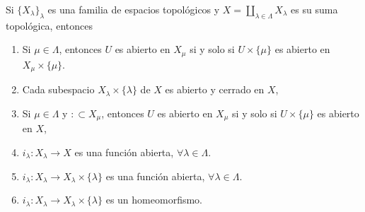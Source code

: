 

\begin{theorem}
Si $\{ X_{\lambda} \}_{\lambda}$ es una familia de espacios topológicos y $X = \coprod_{\lambda \in \Lambda} X_{\lambda}$ es su suma topológica, entonces
\begin{enumerate}[label=\textnormal{(\roman*)}, align=left, labelwidth=1.7em, leftmargin=3.0em]
\item Si $\mu \in \Lambda$, entonces $U$ es abierto en $X_{\mu}$ si y solo si $U \times \{ \mu \}$ es abierto en $X_{\mu} \times \{ \mu \}$.
\item Cada subespacio $X_{\lambda} \times \{ \lambda \}$ de $X$ es abierto y cerrado en $X$,
\item Si $\mu \in \Lambda$ y $: \subset X_{\mu}$, entonces $U$ es abierto en $X_{\mu}$ si y solo si $U \times \{ \mu \}$ es abierto en $X$,
\item $i_{\lambda} : X_{\lambda} \longrightarrow X$ es una función abierta, $\forall \lambda \in \Lambda$.
\item $i_{\lambda} : X_{\lambda} \longrightarrow X_{\lambda} \times \{ \lambda \}$ es una función abierta, $\forall \lambda \in \Lambda$.
\item $i_{\lambda} : X_{\lambda} \longrightarrow X_{\lambda} \times \{ \lambda \}$ es un homeomorfismo.
\end{enumerate}
\end{theorem}

